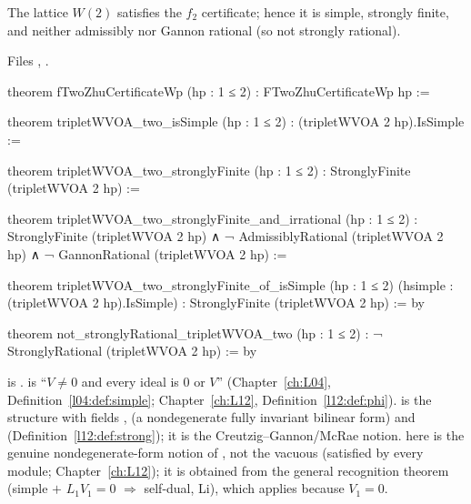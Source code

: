 \begin{theorem}\label{l18:thm:simple}
The lattice $W(2)$ satisfies the $f_2$ certificate; hence it is simple, strongly finite, and neither
admissibly nor Gannon rational (so not strongly rational).
\end{theorem}
\noindent Files ,
.
\begin{leancode}
theorem fTwoZhuCertificateWp (hp : 1 ≤ 2) : FTwoZhuCertificateWp hp :=

theorem tripletWVOA_two_isSimple (hp : 1 ≤ 2) : (tripletWVOA 2 hp).IsSimple :=

theorem tripletWVOA_two_stronglyFinite (hp : 1 ≤ 2) :
    StronglyFinite (tripletWVOA 2 hp) :=

theorem tripletWVOA_two_stronglyFinite_and_irrational (hp : 1 ≤ 2) :
    StronglyFinite (tripletWVOA 2 hp) ∧
      ¬ AdmissiblyRational (tripletWVOA 2 hp) ∧
      ¬ GannonRational (tripletWVOA 2 hp) :=
\end{leancode}
\begin{leancode}
theorem tripletWVOA_two_stronglyFinite_of_isSimple (hp : 1 ≤ 2)
    (hsimple : (tripletWVOA 2 hp).IsSimple) : StronglyFinite (tripletWVOA 2 hp) := by

theorem not_stronglyRational_tripletWVOA_two (hp : 1 ≤ 2) :
    ¬ StronglyRational (tripletWVOA 2 hp) := by
\end{leancode}
\begin{dictionary}
 is .  is
``$V\ne0$ and every ideal is $0$ or $V$'' (Chapter~\ref{ch:L04}, Definition~\ref{l04:def:simple};
Chapter~\ref{ch:L12}, Definition~\ref{l12:def:phi}).  is the structure with fields
,  (a nondegenerate fully invariant bilinear form) and 
(Definition~\ref{l12:def:strong}); it is the Creutzig--Gannon/McRae notion.  here is the
genuine nondegenerate-form notion of , not the vacuous
 (satisfied by every module; Chapter~\ref{ch:L12}); it is obtained from the general
recognition theorem  (simple $+$ $L_1V_1=0$ $\Rightarrow$
self-dual, Li), which applies because $V_1=0$.
\end{dictionary}
